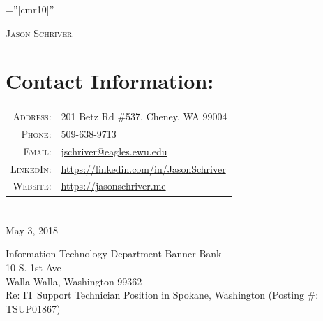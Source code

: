 \documentclass[a4paper,10pt]{article}
\begin{document}

\pagestyle{empty} %

\font\fb=''[cmr10]'' %

{\begin{center}
\textsc		{\Large Jason Schriver}
\end{center}}

\section{Contact Information:}
\begin{tabular}{rl}
    \textsc{Address:}   & 201 Betz Rd \#537, Cheney, WA 99004 \\
    \textsc{Phone:}     & 509-638-9713\\
    \textsc{Email:}     & \href{mailto:jschriver@eagles.ewu.edu}{jschriver@eagles.ewu.edu}\\
    \textsc{LinkedIn:}  & \href{https://linkedin.com/in/JasonSchriver}{https://linkedin.com/in/JasonSchriver}\\
    \textsc{Website:}   & \href{https://jasonschriver.me}{https://jasonschriver.me}
\end{tabular}
\section{}

May 3, 2018
\par

Information Technology Department
Banner Bank\\
10 S. 1st Ave\\
Walla Walla, Washington 99362\\

Re: IT Support Technician Position in Spokane, Washington (Posting \#: TSUP01867)\\
\end{document}
